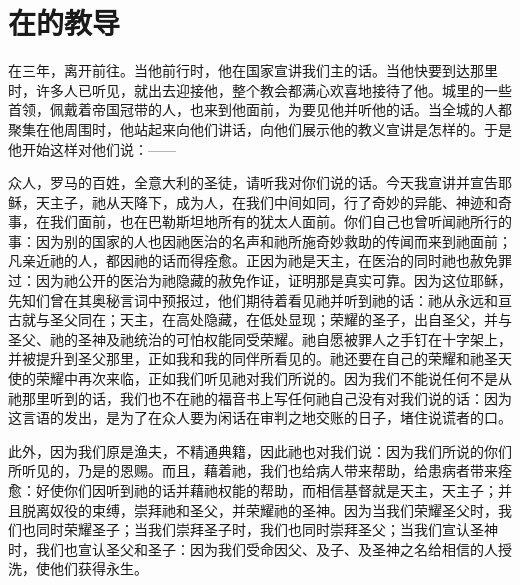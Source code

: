 
\chapter{在的教导}


\par

在三年，离开前往。当他前行时，他在国家宣讲我们主的话。当他快要到达那里时，许多人已听见，就出去迎接他，整个教会都满心欢喜地接待了他。城里的一些首领，佩戴着帝国冠带的人，也来到他面前，为要见他并听他的话。当全城的人都聚集在他周围时，他站起来向他们讲话，向他们展示他的教义宣讲是怎样的。于是他开始这样对他们说：——\par

众人，罗马的百姓，全意大利的圣徒，请听我对你们说的话。今天我宣讲并宣告耶稣，天主子，祂从天降下，成为人，在我们中间如同，行了奇妙的异能、神迹和奇事，在我们面前，也在巴勒斯坦地所有的犹太人面前。你们自己也曾听闻祂所行的事：因为别的国家的人也因祂医治的名声和祂所施奇妙救助的传闻而来到祂面前；凡亲近祂的人，都因祂的话而得痊愈。正因为祂是天主，在医治的同时祂也赦免罪过：因为祂公开的医治为祂隐藏的赦免作证，证明那是真实可靠。因为这位耶稣，先知们曾在其奥秘言词中预报过，他们期待着看见祂并听到祂的话：祂从永远和亘古就与圣父同在；天主，在高处隐藏，在低处显现；荣耀的圣子，出自圣父，并与圣父、祂的圣神及祂统治的可怕权能同受荣耀。祂自愿被罪人之手钉在十字架上，并被提升到圣父那里，正如我和我的同伴所看见的。祂还要在自己的荣耀和祂圣天使的荣耀中再次来临，正如我们听见祂对我们所说的。因为我们不能说任何不是从祂那里听到的话，我们也不在祂的福音书上写任何祂自己没有对我们说的话：因为这言语的发出，是为了在众人要为闲话在审判之地交账的日子，堵住说谎者的口。\par

此外，因为我们原是渔夫，不精通典籍，因此祂也对我们说：因为我们所说的你们所听见的，乃是的恩赐。而且，藉着祂，我们也给病人带来帮助，给患病者带来痊愈：好使你们因听到祂的话并藉祂权能的帮助，而相信基督就是天主，天主子；并且脱离奴役的束缚，崇拜祂和圣父，并荣耀祂的圣神。因为当我们荣耀圣父时，我们也同时荣耀圣子；当我们崇拜圣子时，我们也同时崇拜圣父；当我们宣认圣神时，我们也宣认圣父和圣子：因为我们受命因父、及子、及圣神之名给相信的人授洗，使他们获得永生。\par


